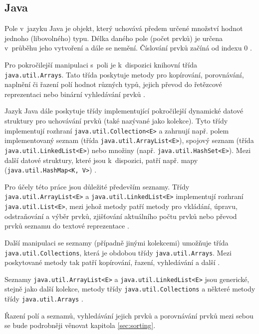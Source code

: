 \documentclass[onepage, a4paper, 12pt]{bakalarka}
\begin{document}
\subsection{Java}
Pole v~jazyku Java je objekt, který uchovává předem určené množství hodnot jednoho (libovolného) typu. Délka daného pole (počet prvků) je určena v~průběhu jeho vytvoření a dále se nemění. Číslování prvků začíná od indexu 0 \cite{java-guide-array}.\par
Pro pokročilejší manipulaci s~poli je k~dispozici knihovní třída \texttt{java.util\-.Arrays}. Tato třída poskytuje metody pro kopírování, porovnávání, naplnění či řazení polí hodnot různých typů, jejich převod do řetězcové reprezentaci nebo binární vyhledávání prvků \cite{java-guide-arrays}.\par
Jazyk Java dále poskytuje třídy implementující pokročilejší dynamické datové struktury pro uchovávání prvků (také nazývané jako kolekce). Tyto třídy implementují rozhraní \texttt{java.util.Collection<E>} a zahrnují např. polem implementovaný seznam (třída \texttt{java.util.ArrayList<E>}), spojový seznam (třída \texttt{java.util.LinkedList<E>}) nebo množiny (např. \texttt{java.util\-.HashSet<E>}). Mezi další datové struktury, které jsou k~dispozici, patří např. mapy (\texttt{java.util.HashMap<K, V>}) \cite{java-guide-collection, java-guide-arraylist, java-guide-linkedlist, java-guide-hashset, java-guide-hashmap}.\par
Pro účely této práce jsou důležité především seznamy. Třídy \texttt{java.util\-.ArrayList<E>} a \texttt{java.util.LinkedList<E>} implementují rozhraní \texttt{java\-.util.List<E>}, mezi jehož metody patří metody pro vkládání, úpravu, odstraňování a výběr prvků, zjišťování aktuálního počtu prvků nebo převod prvků seznamu do textové reprezentace \cite{java-guide-list, java-guide-arraylist, java-guide-linkedlist}.\par
Další manipulaci se seznamy (případně jinými kolekcemi) umožňuje třída \texttt{java.util.Collections}, která je obdobou třídy \texttt{java.util.Arrays}. Mezi poskytované metody tak patří kopírování, řazení, vyhledávání a další \cite{java-guide-collections}.\par
Seznamy \texttt{java.util.ArrayList<E>} a \texttt{java.util.LinkedList<E>} jsou generické, stejně jako další kolekce, metody třídy \texttt{java.util.Collections} a některé metody třídy \texttt{java.util.Arrays} \cite{java-guide-arraylist, java-guide-linkedlist, java-guide-arrays, java-guide-collections}.\par
Řazení polí a seznamů, vyhledávání jejich prvků a porovnávání prvků mezi sebou se bude podrobněji věnovat kapitola \ref{sec:sorting}.
\end{document}
